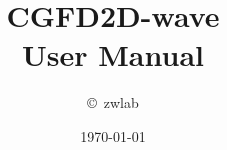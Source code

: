 \documentclass[oneside,english]{book}
\begin{document}


\title{\textbf{CGFD2D-wave}\\
       \textbf{User Manual}}


\author{\copyright \, zwlab}

\date{\today}

\maketitle


\newpage{}



\newpage

\tableofcontents


%









\appendix

%

\end{document}
